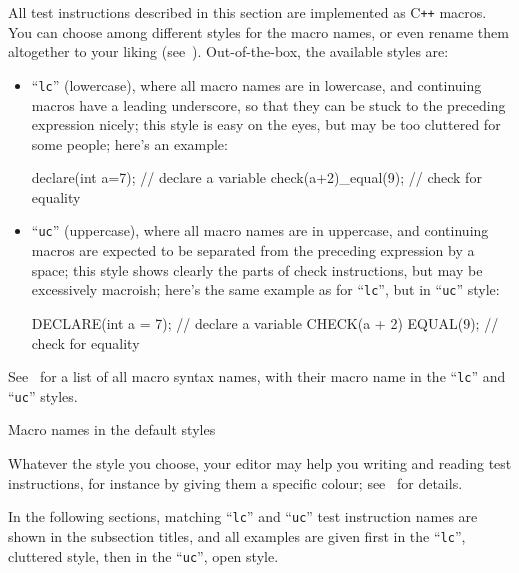 \documentclass[twoside, a4paper, article]{memoir}
\newcommand*\Cpp{C\texttt{++}}
\begin{document}
All test instructions described in this section are implemented as \Cpp{}
macros.  You can choose among different styles for the macro names, or even
rename them altogether to your liking
(see~).
Out-of-the-box, the available styles are:
\begin{itemize}
\item ``\texttt{lc}'' (lowercase), where all macro names are in lowercase, and
  continuing macros have a leading underscore, so that they can be stuck to the
  preceding expression nicely; this style is easy on the eyes, but may be too
  cluttered for some people; here's an example:
\begin{cpplisting}
declare(int a=7); // declare a variable
check(a+2)_equal(9); // check for equality
\end{cpplisting}

\item ``\texttt{uc}'' (uppercase), where all macro names are in uppercase, and
  continuing macros are expected to be separated from the preceding expression
  by a space; this style shows clearly the parts of check instructions, but may
  be excessively macroish; here's the same example as for ``\texttt{lc}'', but
  in ``\texttt{uc}'' style:
\begin{cpplisting}
DECLARE(int a = 7); // declare a variable
CHECK(a + 2) EQUAL(9); // check for equality
\end{cpplisting}
\end{itemize}

See~ for a list of all macro syntax names, with their
macro name in the ``\texttt{lc}'' and ``\texttt{uc}'' styles.

\begin{table}
  \centering
  \begin{footnotesize}
    
  \end{footnotesize}
  \caption{Macro names in the default styles}
  \label{tab:style-table}
\end{table}

Whatever the style you choose, your editor may help you writing and reading
test instructions, for instance by giving them a specific colour;
see~ for details.

In the following sections, matching ``\texttt{lc}'' and ``\texttt{uc}'' test
instruction names are shown in the subsection titles, and all examples are
given first in the ``\texttt{lc}'', cluttered style, then in the
``\texttt{uc}'', open style.
\end{document}
